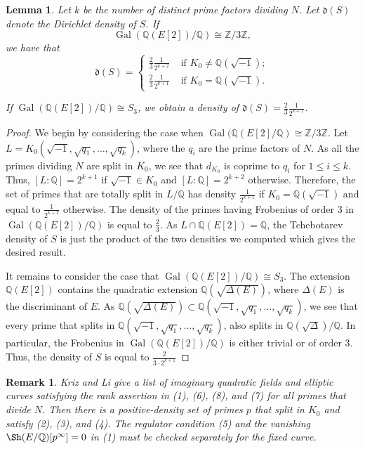 \documentclass[12pt]{amsart}
\newtheorem{lemma}[theorem]{Lemma}
\newtheorem{remark}[theorem]{Remark}
\newcommand{\Z}{\mathbb{Z}}
\newcommand{\Q}{\mathbb{Q}}
\newcommand{\op}[1]{\operatorname{#1}}
\numberwithin{equation}{section}
\begin{document}
\begin{lemma}\label{computation-density} Let $k$ be the number of distinct prime factors dividing $N$. Let $\mathfrak{d}(S)$ denote the Dirichlet density of $S$. If \[\op{Gal}(\Q(E[2])/\Q)\cong \Z/3\Z,\] we have that
    \[\mathfrak{d}(S)=\begin{cases}
        \frac{2}{3}\frac{1}{2^{k+2}} & \text{ if }K_0\neq \Q(\sqrt{-1});\\
        \frac{2}{3}\frac{1}{2^{k+1}} & \text{ if }K_0=\Q(\sqrt{-1}).
    \end{cases}\]

    If $\op{Gal}(\Q(E[2])/\Q)\cong S_3$,  we obtain a density of $\mathfrak{d}(S)=\frac{2}{3}\frac{1}{2^{k+1}}$.
\end{lemma}
\begin{proof} \par We begin by considering the case when $\op{Gal}(\Q(E[2]/\Q)\cong \Z/3\Z$. Let $L=K_0(\sqrt{-1},\sqrt{q_1},\dots,\sqrt{q_k})$, where the $q_i$ are the prime factors of $N$. As all the primes dividing $N$ are split in $K_0$, we see that $d_{K_0}$ is coprime to $q_i$ for $1\le i\le k$. Thus, $[L:\Q]=2^{k+1}$ if $\sqrt{-1}\in K_0$ and $[L:\Q]=2^{k+2}$ otherwise. Therefore, the set of primes that are totally split in $L/\Q$ has density $\frac{1}{2^{k+1}}$ if $K_0=\Q(\sqrt{-1})$ and equal to $\frac{1}{2^{k+2}}$ otherwise. The density of the primes having Frobenius of order $3$ in $\op{Gal}(\Q(E[2])/\Q)$  is equal to $\frac{2}{3}$. As $L\cap \Q(E[2])=\Q$, the Tchebotarev density of $S$ is just the product of the two densities we computed which gives the desired result.
    
    \par It remains to consider the case that $\op{Gal}(\Q(E[2])/\Q)\cong S_3$. The extension $\Q(E[2])$ contains the quadratic extension $\Q(\sqrt{\Delta(E)})$, where $\Delta(E)$ is the discriminant of $E$. As $\Q(\sqrt{\Delta(E)})\subset \Q(\sqrt{-1},\sqrt{q_1},\dots ,\sqrt{q_k})$, we see that every prime that splits in $\Q(\sqrt{-1},\sqrt{q_1},\dots ,\sqrt{q_k})$, also splits in $\Q(\sqrt{\Delta})/\Q$. In particular, the Frobenius in $\op{Gal}(\Q(E[2])/\Q)$ is either trivial or of order $3$. Thus, the density of $S$ is equal to $\frac{2}{3\cdot2^{k+1}}$
\end{proof}
\begin{remark}
Kriz and Li give a list of imaginary quadratic fields and elliptic curves satisfying the rank assertion in (1), (6), (8), and (7) for all primes that divide $N$. Then there is a positive-density set of primes $p$ that split in $K_0$ and satisfy (2), (3), and (4). The regulator condition (5) and the vanishing $\Sh(E/\Q)[p^\infty]=0$ in (1) must be checked separately for the fixed curve.
\end{remark}
\end{document}
